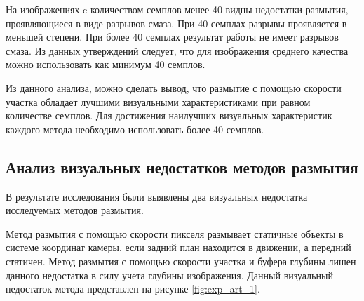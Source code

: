 На изображениях c количеством семплов менее 40 видны недостатки размытия, проявляющиеся в виде разрывов смаза. При 40 семплах разрывы проявляется в меньшей степени. При более 40 семплах результат работы не имеет разрывов смаза. Из данных утверждений следует, что для изображения среднего качества можно использовать как минимум 40 семплов.


Из данного анализа, можно сделать вывод, что размытие с помощью скорости участка обладает лучшими визуальными характеристиками при равном количестве семплов. Для достижения наилучших визуальных характеристик каждого метода необходимо использовать более 40 семплов.  

\subsection{Анализ визуальных недостатков методов размытия}

В результате исследования были выявлены два визуальных недостатка исследуемых методов размытия. 

Метод размытия с помощью скорости пикселя размывает статичные объекты в системе координат камеры, если задний план находится в движении, а передний статичен.  Метод размытия с помощью скорости участка и буфера глубины лишен данного недостатка в силу учета глубины изображения. Данный визуальный недостаток метода представлен на рисунке \ref{fig:exp_art_1}.


